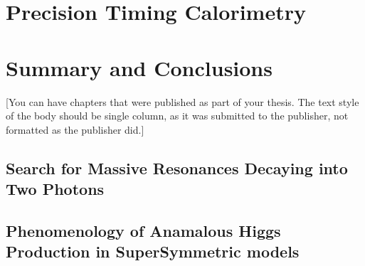 \documentclass[14pt]{caltech_thesis}
\begin{document}
\part{ Precision Timing Calorimetry}

\part{Summary and Conclusions}


[You can have chapters that were published as part of your thesis. The
text style of the body should be single column, as it was submitted to
the publisher, not formatted as the publisher did.]

\printbibliography[heading=bibintoc]

 
\appendix

\chapter{Search for Massive Resonances Decaying into Two Photons}

\chapter{Phenomenology of Anamalous Higgs Production in SuperSymmetric models}






\printindex

\theendnotes

\end{document}

